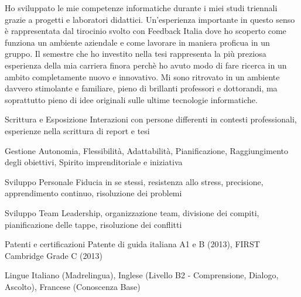 {\begin{cvskills}
\end{cvskills}
\vspace{-5mm}
\begin{cvparagraph}
  Ho sviluppato le mie competenze informatiche durante i miei studi triennali grazie a progetti e laboratori didattici. Un'esperienza importante in questo senso è rappresentata dal tirocinio svolto con Feedback Italia dove ho scoperto come funziona un ambiente aziendale e come lavorare in maniera proficua in un gruppo. Il semestre che ho investito nella tesi rappresenta la più preziosa esperienza della mia carriera finora perchè ho avuto modo di fare ricerca in un ambito completamente nuovo e innovativo. Mi sono ritrovato in un ambiente davvero stimolante e familiare, pieno di brillanti professori e dottorandi, ma soprattutto pieno di idee originali sulle ultime tecnologie informatiche.
\end{cvparagraph}
\vspace{-3mm}
\begin{cvskills}

\cvskill
{Scrittura e Esposizione} %
{Interazioni con persone differenti in contesti professionali, esperienze nella scrittura di report e tesi} %

\cvskill
{Gestione} %
{Autonomia, Flessibilità, Adattabilità, Pianificazione, Raggiungimento degli obiettivi, Spirito imprenditoriale e iniziativa} %

\cvskill
{Sviluppo Personale} %
{Fiducia in se stessi, resistenza allo stress, precisione, apprendimento continuo, risoluzione dei problemi} %

\cvskill
{Sviluppo Team} %
{Leadership, organizzazione team, divisione dei compiti, pianificazione delle tappe, risoluzione dei conflitti} %



\cvskill
{Patenti e certificazioni} %
{Patente di guida italiana A1 e B (2013), FIRST Cambridge Grade C (2013)} %


\cvskill
{Lingue} %
{Italiano (Madrelingua), Inglese (Livello B2 - Comprensione, Dialogo, Ascolto), Francese (Conoscenza Base)} %


\end{cvskills}}
